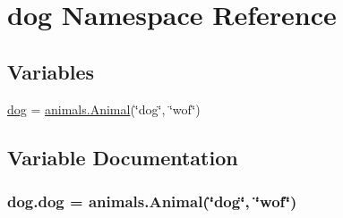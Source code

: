 \hypertarget{namespacedog}{}\section{dog Namespace Reference}
\label{namespacedog}
\subsection*{Variables}
\begin{DoxyCompactItemize}
\item 
\hyperlink{namespacedog_a2b2a4986eb208572451a7aca2f00a9ae}{dog} = \hyperlink{classanimals_1_1_animal}{animals.\+Animal}(\char`\"{}dog\char`\"{}, \char`\"{}wof\char`\"{})
\end{DoxyCompactItemize}


\subsection{Variable Documentation}
\subsubsection[{\texorpdfstring{dog}{dog}}]{\setlength{\rightskip}{0pt plus 5cm}dog.\+dog = {\bf animals.\+Animal}(\char`\"{}dog\char`\"{}, \char`\"{}wof\char`\"{})}\hypertarget{namespacedog_a2b2a4986eb208572451a7aca2f00a9ae}{}\label{namespacedog_a2b2a4986eb208572451a7aca2f00a9ae}
